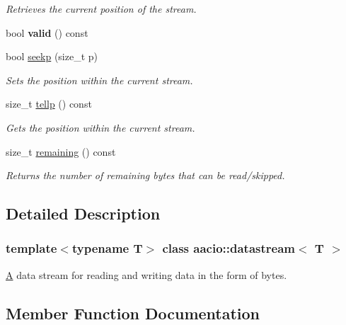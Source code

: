 \begin{DoxyCompactItemize}
\begin{DoxyCompactList}\small\item\em Retrieves the current position of the stream. \end{DoxyCompactList}\item 
\mbox{\label{classaacio_1_1datastream_aa5bd3e0ccdbd2cc81fe0e7e906a05832}} 
bool {\bfseries valid} () const
\item 
bool \mbox{\hyperlink{classaacio_1_1datastream_af1b27cb7b6b4fbf6d13b2512d1f7f55b}{seekp}} (size\+\_\+t p)
\begin{DoxyCompactList}\small\item\em Sets the position within the current stream. \end{DoxyCompactList}\item 
size\+\_\+t \mbox{\hyperlink{classaacio_1_1datastream_a8cfb6fd8d13e7fa5e146007b77b16ac3}{tellp}} () const
\begin{DoxyCompactList}\small\item\em Gets the position within the current stream. \end{DoxyCompactList}\item 
size\+\_\+t \mbox{\hyperlink{classaacio_1_1datastream_a2d12bc92e24b2621cba916b188428aff}{remaining}} () const
\begin{DoxyCompactList}\small\item\em Returns the number of remaining bytes that can be read/skipped. \end{DoxyCompactList}\end{DoxyCompactItemize}


\subsection{Detailed Description}
\subsubsection*{template$<$typename T$>$\newline
class aacio\+::datastream$<$ T $>$}

\mbox{\hyperlink{struct_a}{A}} data stream for reading and writing data in the form of bytes. 

\subsection{Member Function Documentation}
\mbox{\label{classaacio_1_1datastream_a57d58fd66643f7ba9f1058a01e36fa38}} 
